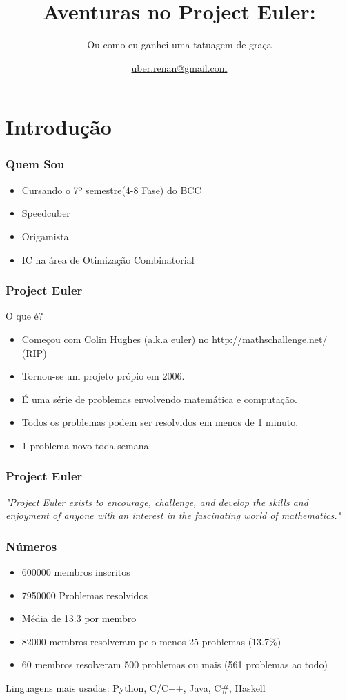 \documentclass{beamer}
\title[Project Euler]{Aventuras no Project Euler:}
\subtitle{Ou como eu ganhei uma tatuagem de graça}
\author[Renan S. Silva]{{\small \url{uber.renan@gmail.com}}}
\institute[UDESC]{Departamento de Ci\^encia da Computa\c{c}\~ao \\
    Centro de Ci\^encias e Tecnol\'ogias\\
Universidade do Estado de Santa Catarina}
\begin{document}
\begin{frame}
    \titlepage

\end{frame}

\section{Introdução}
\begin{frame}
    \frametitle{Quem Sou}

    \begin{itemize}
        \item Cursando o 7º semestre(4-8 Fase) do BCC
        \item Speedcuber
        \item Origamista
        \item IC na área de Otimização Combinatorial
    \end{itemize}
\end{frame}

\begin{frame}
    \frametitle{Project Euler}
    O que é?

    \begin{itemize}
        \item Começou com Colin Hughes (a.k.a euler) no \url{http://mathschallenge.net/} (RIP)
        \item Tornou-se um projeto própio em 2006.
        \item É uma série de problemas envolvendo matemática e computação.
        \item Todos os problemas podem ser resolvidos em menos de 1 minuto.
        \item 1 problema novo toda semana.
    \end{itemize}
\end{frame}

\begin{frame}
    \frametitle{Project Euler}

    \begin{center}
        \textit{
            "Project Euler exists to encourage, challenge, and develop the skills and enjoyment of anyone with an interest in the fascinating world of mathematics."
        }
    \end{center}
\end{frame}

\begin{frame}
    \frametitle{Números}

    \begin{itemize}
        \item 600000 membros inscritos
        \item 7950000 Problemas resolvidos
        \item Média de 13.3 por membro
        \item 82000 membros resolveram pelo menos 25 problemas (13.7\%)
        \item 60 membros resolveram 500 problemas ou mais (561 problemas ao todo)
    \end{itemize}

    Linguagens mais usadas: Python, C/C++, Java, C\#, Haskell
\end{frame}
\end{document}
